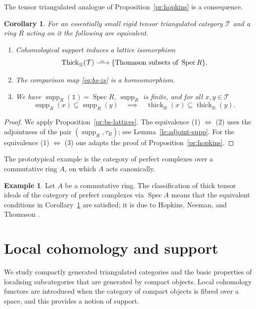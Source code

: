 \documentclass{amsart}[a4]
\newtheorem{corollary}[theorem]{Corollary}
\theoremstyle{definition}
\newtheorem{example}[theorem]{Example}
\theoremstyle{remark}
\numberwithin{equation}{section}
\newcommand{\Spec}{\operatorname{Spec}}
\newcommand{\supp}{\operatorname{supp}}
\newcommand{\thick}{\operatorname{thick}}
\newcommand{\Thick}{\operatorname{Thick}}
\newcommand{\longiso}{\xrightarrow{\
    \raisebox{-.6ex}[0ex][0ex]{$\scriptstyle{\sim}$}\ }}
\newcommand{\cat}{\mathcal}
\newcommand{\one}{\mathds 1}
\begin{document}
The tensor triangulated analogue of Proposition~\ref{pr:hopkins} is a consequence.

\begin{corollary}\label{co:HNT}
  For an essentially small rigid tensor triangulated category $\cat T$
  and a ring $R$ acting on it the following are equivalent.
  \begin{enumerate}
\item   
  Cohomological support induces a lattice isomorphism
  \[\Thick_\otimes(\cat T)\longiso   \{\text{Thomason subsets of }\Spec
    R\}.\]
\item The comparison map \eqref{eq:bs-zs} is a homeomorphism.
\item We have $\supp_R(\one)=\Spec R$, $\supp_R$ is finite, and  for all $x,y\in\cat T$
  \[\supp_R(x)\subseteq\supp_R(y)\quad \implies\quad
    \thick_\otimes(x)\subseteq\thick_\otimes(y).\]
\end{enumerate}
\end{corollary}
\begin{proof}
  We apply Proposition~\ref{pr:bs-lattices}.  The equivalence (1)
  $\Leftrightarrow$ (2) uses the adjointness of the pair
  $(\supp_R,\tau_R)$; see Lemma~\ref{le:adjoint-supp}.  For the
  equivalence (1) $\Leftrightarrow$ (3) one adapts the proof of
  Proposition~\ref{pr:hopkins}.
\end{proof}

The prototypical example is the category of perfect complexes over a
commutative ring $A$, on which $A$ acts canonically.

\begin{example}
  Let $A$ be a commutative ring.  The classification of thick tensor
  ideals of the category of perfect complexes via $\Spec A$ means that
  the equivalent conditions in Corollary~\ref{co:HNT} are satisfied;
  it is due to Hopkins, Neeman, and Thomason
  \cite{Hopkins:1987a,Neeman:1992a,Thomason:1997a}.
\end{example}



\section{Local cohomology and support}

We study compactly generated triangulated categories and the basic
properties of localising subcategories that are generated by compact
objects.  Local cohomology functors are introduced when the category
of compact objects is fibred over a space, and this provides a notion
of support.
\end{document}
